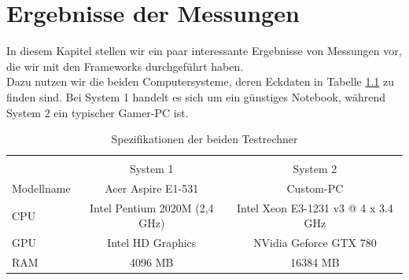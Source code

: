 \chapter{Ergebnisse der Messungen}
\label{ch:results}
In diesem Kapitel stellen wir ein paar interessante Ergebnisse von Messungen vor, die wir mit den Frameworks durchgeführt haben.\\
Dazu nutzen wir die beiden Computersysteme, deren Eckdaten in Tabelle \ref{tab:allspecs} zu finden sind. Bei System 1 handelt es sich um ein günstiges Notebook, während System 2 ein typischer Gamer-PC ist.

\begin{table}
    \begin{tabular}{ | l | c | c |}
    \hline \\
    			& System 1						& System 2      						\\ \hline
    Modellname 	& Acer Aspire E1-531			& Custom-PC 							\\ \hline
    CPU 		& Intel Pentium 2020M (2,4 GHz) & Intel Xeon E3-1231 v3 @ 4 x 3.4 GHz 	\\ \hline
    GPU 		& Intel HD Graphics				& NVidia Geforce GTX 780				\\ \hline
    RAM 		& 4096 MB						& 16384 MB 								\\ \hline
    \end{tabular}
    \caption{Spezifikationen der beiden Testrechner}
   	\label{tab:allspecs}
\end{table}

